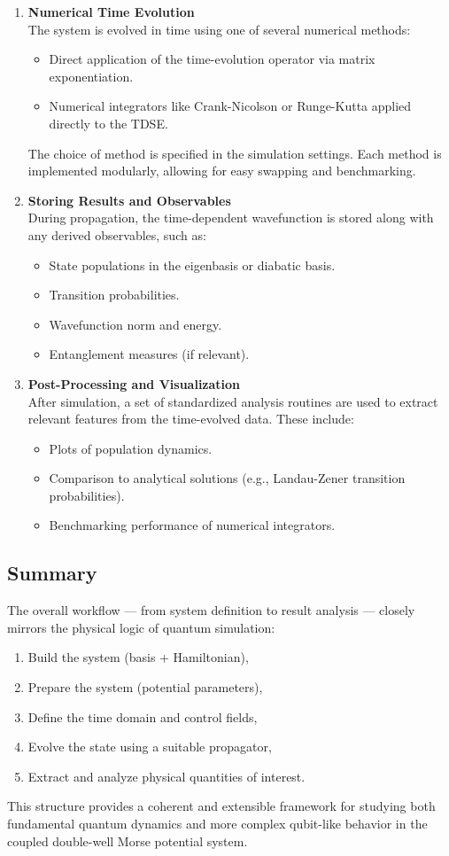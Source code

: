 \documentclass{subfiles}
\begin{document}
\begin{enumerate}
    \item \textbf{Numerical Time Evolution} \\
    The system is evolved in time using one of several numerical methods:
    \begin{itemize}
        \item Direct application of the time-evolution operator via matrix exponentiation.
        \item Numerical integrators like Crank-Nicolson or Runge-Kutta applied directly to the TDSE.
    \end{itemize}
    The choice of method is specified in the simulation settings. Each method is implemented modularly, allowing for easy swapping and benchmarking.

    \item \textbf{Storing Results and Observables} \\
    During propagation, the time-dependent wavefunction is stored along with any derived observables, such as:
    \begin{itemize}
        \item State populations in the eigenbasis or diabatic basis.
        \item Transition probabilities.
        \item Wavefunction norm and energy.
        \item Entanglement measures (if relevant).
    \end{itemize}

    \item \textbf{Post-Processing and Visualization} \\
    After simulation, a set of standardized analysis routines are used to extract relevant features from the time-evolved data. These include:
    \begin{itemize}
        \item Plots of population dynamics.
        \item Comparison to analytical solutions (e.g., Landau-Zener transition probabilities).
        \item Benchmarking performance of numerical integrators.
    \end{itemize}
\end{enumerate}

\subsection*{Summary}

The overall workflow — from system definition to result analysis — closely mirrors the physical logic of quantum simulation:
\begin{enumerate}
    \item Build the system (basis + Hamiltonian),
    \item Prepare the system (potential parameters),
    \item Define the time domain and control fields,
    \item Evolve the state using a suitable propagator,
    \item Extract and analyze physical quantities of interest.
\end{enumerate}

This structure provides a coherent and extensible framework for studying both fundamental quantum dynamics and more complex qubit-like behavior in the coupled double-well Morse potential system.
\end{document}

